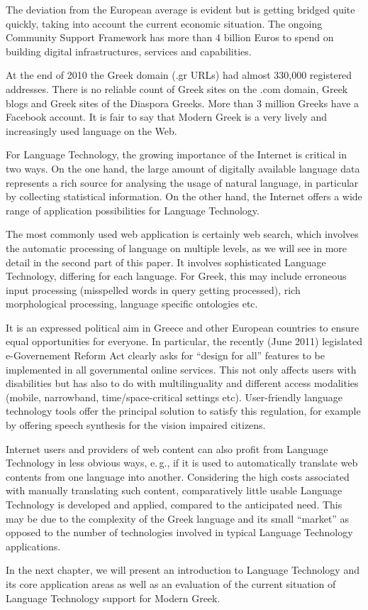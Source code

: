 \begin{multicols}{2}
The deviation from the European average is evident but is getting bridged quite quickly, taking into account the current economic situation. The ongoing Community Support Framework has more than 4 billion Euros to spend on building digital infrastructures, services and capabilities.

At the end of 2010 the Greek domain (.gr URLs) had almost 330,000 registered addresses. There is no reliable count of Greek sites on the .com domain, Greek blogs and Greek sites of the Diaspora Greeks. More than 3 million Greeks have a Facebook account. It is fair to say that Modern Greek is a very lively and increasingly used language on the Web.

For Language Technology, the growing importance of the Internet is critical in two ways. On the one hand, the large amount of digitally available language data represents a rich source for analysing the usage of natural language, in particular by collecting statistical information. On the other hand, the Internet offers a wide range of application possibilities for Language Technology.

The most commonly used web application is certainly web search, which involves the automatic processing of language on multiple levels, as we will see in more detail in the second part of this paper. It involves sophisticated Language Technology, differing for each language. For Greek, this may include erroneous input processing (misspelled words in query getting processed), rich morphological processing, language specific ontologies etc.

It is an expressed political aim in Greece and other European countries to ensure equal opportunities for everyone. In particular, the recently (June 2011) legislated e-Governement Reform Act clearly asks for “design for all” features to be implemented in all governmental online services. This not only affects users with disabilities but has also to do with multilinguality and different access modalities (mobile, narrowband, time/space-critical settings etc). User-friendly language technology tools offer the principal solution to satisfy this regulation, for example by offering speech synthesis for the vision impaired citizens.

Internet users and providers of web content can also profit from Language Technology in less obvious ways, e.\,g., if it is used to automatically translate web contents from one language into another. Considering the high costs associated with manually translating such content, comparatively little usable Language Technology is developed and applied, compared to the anticipated need. This may be due to the complexity of the Greek language and its small “market” as opposed to the number of technologies involved in typical Language Technology applications. 

In the next chapter, we will present an introduction to Language Technology and its core application areas as well as an evaluation of the current situation of Language Technology support for Modern Greek.
\end{multicols}

